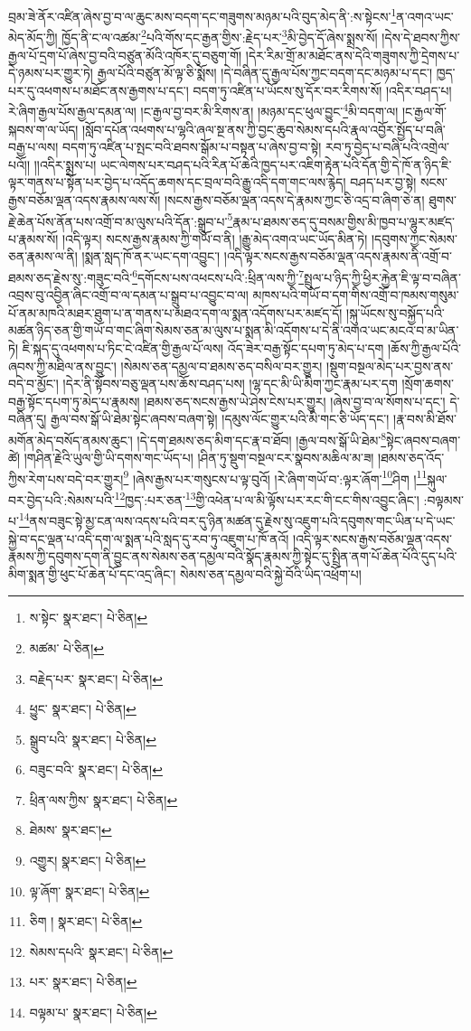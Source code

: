 བྲམ་ཟེ་ནོར་འཛིན་ཞེས་བྱ་བ་ལ་ཆུང་མས་བདག་དང་གཟུགས་མཉམ་པའི་བུད་མེད་ནི་:ས་སྟེངས་\footnote{ས་སྟེང་  སྣར་ཐང་།  པེ་ཅིན། }ན་འགའ་ཡང་མེད་མོད་ཀྱི། ཁྱོད་ནི་ང་ལ་འཚམ་\footnote{མཚམ་  པེ་ཅིན། }པའི་གོས་དང་རྒྱན་གྱིས་:རྗེད་པར་\footnote{བརྗེད་པར་  སྣར་ཐང་།  པེ་ཅིན། }མི་བྱེད་དོ་ཞེས་སྨྲས་སོ། །དེས་དེ་ཐབས་ཀྱིས་རྒྱལ་པོ་དྲག་པོ་ཞེས་བྱ་བའི་བཙུན་མོའི་འཁོར་དུ་བཅུག་གོ། །དེར་རིམ་གྲོ་མ་མཐོང་ནས་དེའི་གཟུགས་ཀྱི་དྲེགས་པ་དེ་ཉམས་པར་གྱུར་ཏེ། རྒྱལ་པོའི་བཙུན་མོ་ལྟ་ཅི་སྨོས། །དེ་བཞིན་དུ་རྒྱལ་པོས་ཀྱང་བདག་དང་མཉམ་པ་དང་། ཁྱད་པར་དུ་འཕགས་པ་མཐོང་ནས་རྒྱགས་པ་དང་། བདག་ཏུ་འཛིན་པ་ཡོངས་སུ་དོར་བར་རིགས་སོ། །འདིར་བཤད་པ། རེ་ཞིག་རྒྱལ་པོས་རྒྱལ་དམན་ལ། །ང་རྒྱལ་བྱ་བར་མི་རིགས་ན། །མཉམ་དང་ཕུལ་བྱུང་\footnote{ཕྱུང་  སྣར་ཐང་།  པེ་ཅིན། }མི་བདག་ལ། །ང་རྒྱལ་གོ་སྐབས་ག་ལ་ཡོད། །སློབ་དཔོན་འཕགས་པ་ལྷའི་ཞལ་སྔ་ནས་ཀྱི་བྱང་ཆུབ་སེམས་དཔའི་རྣལ་འབྱོར་སྤྱོད་པ་བཞི་བརྒྱ་པ་ལས། བདག་ཏུ་འཛིན་པ་སྤང་བའི་ཐབས་སྒོམ་པ་བསྟན་པ་ཞེས་བྱ་བ་སྟེ། རབ་ཏུ་བྱེད་པ་བཞི་པའི་འགྲེལ་པའོ།། །།འདིར་སྨྲས་པ། ཡང་ལེགས་པར་བཤད་པའི་རིན་པོ་ཆེའི་ཁྱད་པར་འཇིག་རྟེན་པའི་དོན་གྱི་དེ་ཁོ་ན་ཉིད་ཇི་ལྟར་གནས་པ་སྟོན་པར་བྱེད་པ་འདོད་ཆགས་དང་བྲལ་བའི་རྒྱུ་འདི་དག་གང་ལས་རྙེད། བཤད་པར་བྱ་སྟེ། སངས་རྒྱས་བཅོམ་ལྡན་འདས་རྣམས་ལས་སོ། །སངས་རྒྱས་བཅོམ་ལྡན་འདས་དེ་རྣམས་ཀྱང་ཅི་འདྲ་བ་ཞིག་ཅེ་ན། ཐུགས་རྗེ་ཆེན་པོས་ནོན་པས་འགྲོ་བ་མ་ལུས་པའི་དོན་:སྒྲུབ་པ་\footnote{སྒྲུབ་པའི་  སྣར་ཐང་།  པེ་ཅིན། }རྣམ་པ་ཐམས་ཅད་དུ་བསམ་གྱིས་མི་ཁྱབ་པ་ལྷུར་མཛད་པ་རྣམས་སོ། །འདི་ལྟར། སངས་རྒྱས་རྣམས་ཀྱི་གཡོ་བ་ནི། །རྒྱུ་མེད་འགའ་ཡང་ཡོད་མིན་ཏེ། །དབུགས་ཀྱང་སེམས་ཅན་རྣམས་ལ་ནི། །སྨན་སླད་ཁོ་ནར་ཡང་དག་འབྱུང་། །འདི་ལྟར་སངས་རྒྱས་བཅོམ་ལྡན་འདས་རྣམས་ནི་འགྲོ་བ་ཐམས་ཅད་རྗེས་སུ་:གཟུང་བའི་\footnote{བཟུང་བའི་  སྣར་ཐང་།  པེ་ཅིན། }དགོངས་པས་འཕངས་པའི་:ཕྲིན་ལས་ཀྱི་\footnote{ཕྲིན་ལས་ཀྱིས་  སྣར་ཐང་།  པེ་ཅིན། }སྤྲུལ་པ་ཉིད་ཀྱི་ཕྱིར་རྐྱེན་ཇི་ལྟ་བ་བཞིན་འབྲས་བུ་འབྱིན་ཞིང་འགྲོ་བ་ལ་དམན་པ་སྒྲུབ་པ་འབྱུང་བ་ལ། མཁས་པའི་གཡོ་བ་དག་གིས་འགྲོ་བ་ཁམས་གསུམ་པོ་ནམ་མཁའི་མཐར་ཐུག་པ་ན་གནས་པ་མཐའ་དག་ལ་སྨན་འདོགས་པར་མཛད་དོ། །སྐུ་ཡོངས་སུ་བསྐྱོད་པའི་མཚན་ཉིད་ཅན་གྱི་གཡོ་བ་གང་ཞིག་སེམས་ཅན་མ་ལུས་པ་སྨན་མི་འདོགས་པ་དེ་ནི་འགའ་ཡང་མངའ་བ་མ་ཡིན་ཏེ། ཇི་སྐད་དུ་འཕགས་པ་ཏིང་ངེ་འཛིན་གྱི་རྒྱལ་པོ་ལས། འོད་ཟེར་བརྒྱ་སྟོང་དཔག་ཏུ་མེད་པ་དག །ཆོས་ཀྱི་རྒྱལ་པོའི་ཞབས་ཀྱི་མཐིལ་ནས་བྱུང་། །སེམས་ཅན་དམྱལ་བ་ཐམས་ཅད་བསིལ་བར་གྱུར། །སྡུག་བསྔལ་མེད་པར་བྱས་ནས་བདེ་བ་མྱོང་། །དེར་ནི་སྟོབས་བཅུ་ལྡན་པས་ཆོས་བཤད་པས། །ལྷ་དང་མི་ཡི་མིག་ཀྱང་རྣམ་པར་དག །སྲོག་ཆགས་བརྒྱ་སྟོང་དཔག་ཏུ་མེད་པ་རྣམས། །ཐམས་ཅད་སངས་རྒྱས་ཡེ་ཤེས་ངེས་པར་གྱུར། །ཞེས་བྱ་བ་ལ་སོགས་པ་དང་། དེ་བཞིན་དུ། རྒྱལ་བས་སྒོ་ཡི་ཐེམ་སྟེང་ཞབས་བཞག་སྟེ། །དམུས་ལོང་གྱུར་པའི་མི་གང་ཅི་ཡོད་དང་། །རྣ་བས་མི་ཐོས་མགོན་མེད་བསོད་ནམས་ཆུང་། །དེ་དག་ཐམས་ཅད་མིག་དང་རྣ་བ་ཐོབ། །རྒྱལ་བས་སྒོ་ཡི་ཐེམ་\footnote{ཐེམས་  སྣར་ཐང་། }སྟེང་ཞབས་བཞག་ཚེ། །གཤིན་རྗེའི་ཡུལ་གྱི་ཡི་དགས་གང་ཡོད་པ། །ཤིན་ཏུ་སྡུག་བསྔལ་ངར་སྣབས་མཆིལ་མ་ཟ། །ཐམས་ཅད་འོད་ཀྱིས་རེག་པས་བདེ་བར་གྱུར།\footnote{འགྱུར།  སྣར་ཐང་།  པེ་ཅིན། } །ཞེས་རྒྱས་པར་གསུངས་པ་ལྟ་བུའོ། །རེ་ཞིག་གཡོ་བ་:ལྟར་ཞོག་\footnote{ལྟ་ཞོག་  སྣར་ཐང་།  པེ་ཅིན། }ཤིག །\footnote{ཅིག །  སྣར་ཐང་།  པེ་ཅིན། }སྐུལ་བར་བྱེད་པའི་:སེམས་པའི་\footnote{སེམས་དཔའི་  སྣར་ཐང་།  པེ་ཅིན། }ཁྱད་:པར་ཅན་\footnote{པར་  སྣར་ཐང་།  པེ་ཅིན། }གྱི་འཕེན་པ་ལ་མི་ལྟོས་པར་རང་གི་ངང་གིས་འབྱུང་ཞིང་། :བལྟམས་པ་\footnote{བལྟམ་པ་  སྣར་ཐང་།  པེ་ཅིན། }ནས་བཟུང་སྟེ་མྱ་ངན་ལས་འདས་པའི་བར་དུ་ཉིན་མཚན་དུ་རྗེས་སུ་འཇུག་པའི་དབུགས་གང་ཡིན་པ་དེ་ཡང་སྐྱེ་བ་དང་ལྡན་པ་འདི་དག་ལ་སྨན་པའི་སླད་དུ་རབ་ཏུ་འཇུག་པ་ཁོ་ནའོ། །འདི་ལྟར་སངས་རྒྱས་བཅོམ་ལྡན་འདས་རྣམས་ཀྱི་དབུགས་དག་ནི་བྱུང་ནས་སེམས་ཅན་དམྱལ་བའི་སྣོད་རྣམས་ཀྱི་སྟེང་དུ་སྤྲིན་ནག་པོ་ཆེན་པོའི་དུད་པའི་མིག་སྨན་གྱི་ཕུང་པོ་ཆེན་པོ་དང་འདྲ་ཞིང་། སེམས་ཅན་དམྱལ་བའི་སྐྱེ་བོའི་ཡིད་འཕྲོག་པ། 